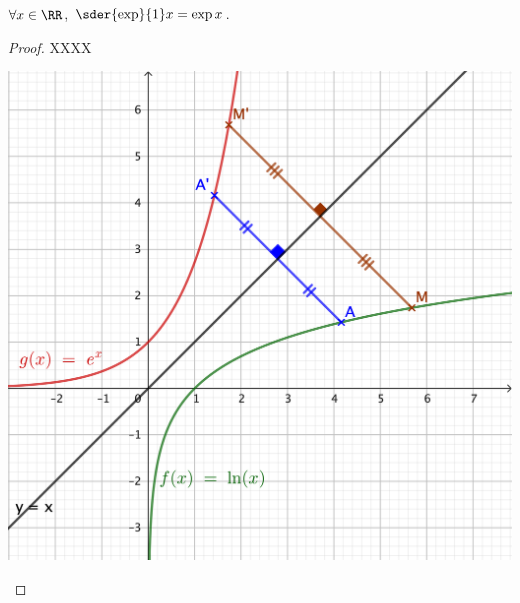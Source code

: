\begin{fact}
	$\forall x \in \RR$,
	$\sder{\exp}{1} x = \exp x$.
\end{fact}


\begin{proof}
	XXXX


	\begin{center}
		\includegraphics[scale=.85]{content/exp/der.png}
	\end{center}
\end{proof}